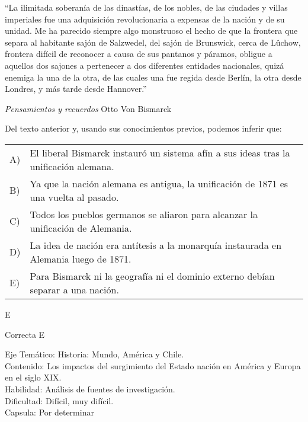 \documentclass[letterpaper,11pt]{article}
\newcommand{\anchopregunta}{0.9\textwidth}
\begin{document}
\begin{enumerate}
\begin{minipage}{\anchopregunta}
\item ``La ilimitada soberanía de las dinastías, de los nobles, de las ciudades y villas imperiales fue una adquisición revolucionaria a expensas de la nación y de su unidad. Me ha parecido siempre algo monstruoso el hecho de que la frontera que separa al habitante sajón de Salzwedel, del sajón de Brunswick, cerca de Lûchow, frontera difícil de reconocer a causa de sus pantanos y páramos, obligue a aquellos dos sajones a pertenecer a dos diferentes entidades nacionales, quizá enemiga la una de la otra, de las cuales una fue regida desde Berlín, la otra desde Londres, y más tarde desde Hannover.''
\begin{flushright}
\textit{Pensamientos y recuerdos} Otto Von Bismarck
\end{flushright}
Del texto anterior y, usando sus conocimientos previos, podemos inferir que:
\begin{flushleft}\begin{tabular}{@{\hspace{-.001\textwidth}}l@{\hspace{2pt}}p{}}
A)& El liberal Bismarck instauró un sistema afín a sus ideas  tras la unificación alemana.\\
B)& Ya que la nación alemana es antigua, la unificación de 1871 es una vuelta al pasado.\\
C)& Todos los pueblos germanos se aliaron para alcanzar la unificación de Alemania.\\
D)& La idea de nación era antítesis a la monarquía instaurada en Alemania luego de 1871.\\
E)& Para Bismarck ni la geografía ni el dominio externo debían separar a una nación.\\ 
\end{tabular}\end{flushleft}%
\begin{key} E
\end{key} 
\begin{hint}
\end{hint}
\begin{answer} Correcta E \\
\end{answer}
\begin{info} %
\begin{flushleft}
Eje Temático: Historia: Mundo, América y Chile.\\
Contenido: Los impactos del surgimiento del Estado nación en América y Europa en el siglo XIX.\\
Habilidad: Análisis de fuentes de investigación.\\
Dificultad: Difícil, muy difícil.\\
Capsula: Por determinar \\
\end{flushleft} 
\end{info}
\end{minipage}\vfill$\;$ %


\end{enumerate}
\end{document}
